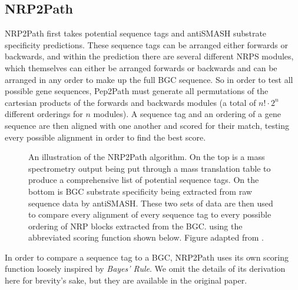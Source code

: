\documentclass{l4proj}
\begin{document}
\subsection{NRP2Path} \label{nrpbackground}

NRP2Path first takes potential sequence tags and antiSMASH substrate specificity predictions. These sequence tags can be arranged either forwards or backwards, and within the prediction there are several different NRPS modules, which themselves can either be arranged forwards or backwards and can be arranged in any order to make up the full BGC sequence. So in order to test all possible gene sequences, Pep2Path must generate all permutations of the cartesian products of the forwards and backwards modules (a total of \(n!\cdot2^n\) different orderings for \(n\) modules). A sequence tag and an ordering of a gene sequence are then aligned with one another and scored for their match, testing every possible alignment in order to find the best score.

\begin{figure}
    \centering

    \caption{An illustration of the NRP2Path algorithm. On the top is a mass spectrometry output being put through a mass translation table to produce
    a comprehensive list of potential sequence tags. On the bottom is BGC substrate specificity being extracted from raw sequence data by antiSMASH.
    These two sets of data are then used to compare every alignment of every sequence tag to every possible ordering of NRP blocks extracted from the 
    BGC. using the abbreviated scoring function shown below. Figure adapted from \cite{p2p}.
    }

    \label{fig:nrp2path}
\end{figure}

In order to compare a sequence tag to a BGC, NRP2Path uses its own scoring function loosely inspired by \textit{Bayes' Rule}. We omit the details of its derivation here for brevity's sake, but they are available in the original paper.
\end{document}
